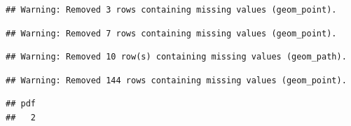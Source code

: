 \documentclass[
]{article}
\begin{document}
\begin{verbatim}
## Warning: Removed 3 rows containing missing values (geom_point).
\end{verbatim}

\begin{verbatim}
## Warning: Removed 7 rows containing missing values (geom_point).
\end{verbatim}

\begin{verbatim}
## Warning: Removed 10 row(s) containing missing values (geom_path).
\end{verbatim}

\begin{verbatim}
## Warning: Removed 144 rows containing missing values (geom_point).
\end{verbatim}

\begin{verbatim}
## pdf 
##   2
\end{verbatim}
\end{document}
